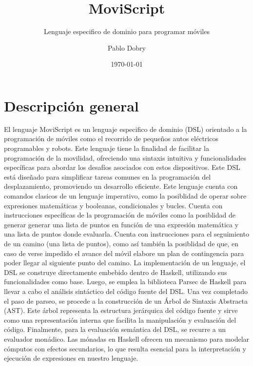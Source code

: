 \documentclass[11pt]{scrartcl}
\title{MoviScript}
\subtitle{Lenguaje especifico de dominio para programar m\'oviles}
\author{ Pablo Dobry }
\date{\today}
\begin{document}
\lstset{language=Haskell}
\maketitle	
\pagebreak

\section{Descripci\'on general}

El lenguaje MoviScript es un lenguaje especifico de dominio (DSL) orientado a la 
programaci\'on de m\'oviles como el recorrido de pequeños autos eléctricos 
programables y robots. Este lenguaje tiene la finalidad de facilitar 
la programación de la movilidad, ofreciendo una sintaxis intuitiva 
y funcionalidades específicas para abordar los desafíos asociados con estos dispositivos.
Este DSL está diseñado para simplificar tareas comunes en la programación del desplazamiento, 
promoviendo un desarrollo eficiente.\newline
Este lenguaje cuenta con comandos clasicos de un lenguaje imperativo, como la posiblidad 
de operar sobre expresiones matem\'aticas y booleanas, condicionales y bucles.
Cuenta con instrucciones espec\'ificas de la programaci\'on de m\'oviles como 
la posiblidad de generar generar una lista de puntos en funci\'on de una expresi\'on 
matem\'atica y una lista de puntos donde evaluarla.\newline
Cuenta con instrucciones para el seguimiento de un camino (una lista de puntos), como as\'i tambi\'en
la posiblidad de que, en caso de verse impedido el avance del m\'ovil elabore 
un plan de contingencia para poder llegar al siguiente punto del camino.\newline
La implementaci\'on de un lenguaje, el DSL se construye directamente embebido 
dentro de Haskell, utilizando sus funcionalidades como base.
Luego, se emplea la biblioteca Parsec de Haskell para llevar a cabo 
el análisis sint\'actico del c\'odigo fuente del DSL.  \newline
Una vez completado el paso de parseo, se procede a la construcción de un 
\'Arbol de Sintaxis Abstracta (AST). Este \'arbol representa 
la estructura jerárquica del c\'odigo fuente y sirve como una 
representaci\'on interna que facilita la manipulaci\'on y evaluación del c\'odigo.\newline
Finalmente, para la evaluación semántica del DSL, se recurre a un evaluador mon\'adico. 
Las m\'onadas en Haskell ofrecen un mecanismo para modelar c\'omputos con efectos 
secundarios, lo que resulta esencial para la interpretación y ejecuci\'on 
de expresiones en nuestro lenguaje.\newline
\end{document}
